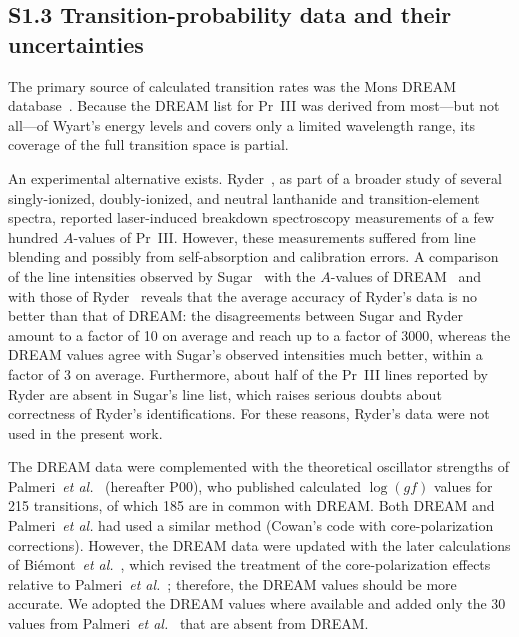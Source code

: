 \documentclass[10pt]{article}
\begin{document}
\subsection*{S1.3 Transition-probability data and their uncertainties}
\label{ssec:tp}
The primary source of calculated transition rates was the Mons DREAM
database~\cite{DREAM}. Because the DREAM list for Pr~III was derived from
most---but not all---of Wyart's energy levels and covers only a limited
wavelength range, its coverage of the full transition space is partial.

An experimental alternative exists. Ryder~\cite{Ryder2011}, as part of a
broader study of several singly-ionized, doubly-ionized, and neutral
lanthanide and transition-element spectra, reported laser-induced breakdown
spectroscopy measurements of a few hundred $A$-values of Pr~III. However, these
measurements suffered from line blending and possibly from
self-absorption and calibration errors. A comparison of the line intensities
observed by Sugar~\cite{Sugar1969,Sugar1974} with the $A$-values of
DREAM~\cite{DREAM} and with those of Ryder~\cite{Ryder2011} reveals that the
average accuracy of Ryder's data is no better than that of DREAM: the
disagreements between Sugar and Ryder amount to a factor of 10 on average and
reach up to a factor of 3000, whereas the DREAM values agree with Sugar's
observed intensities much better, within a factor of 3 on average. 
Furthermore, about half of the Pr~III lines reported by Ryder are absent in 
Sugar's line list, which raises serious doubts about correctness of Ryder's identifications.
For these reasons, Ryder's data were not used in the present work.

The DREAM data were complemented with the theoretical oscillator strengths of
Palmeri~\textit{et al.}~\cite{Palmeri2000} (hereafter P00), who published
calculated $\log(gf)$ values for 215 transitions, of which 185 are in common
with DREAM.
Both DREAM and Palmeri~\textit{et al.} had used a similar method
(Cowan's code with core-polarization corrections). However, the DREAM data 
were updated with the later calculations of Bi\'emont~\textit{et
al.}~\cite{Biemont2001}, which revised the treatment of the core-polarization
effects relative to Palmeri~\textit{et al.}~\cite{Palmeri2000}; therefore, the DREAM
values should be more accurate. We adopted the DREAM
values where available and added only the 30 values from
Palmeri~\textit{et al.}~\cite{Palmeri2000} that are absent from DREAM.
\end{document}
